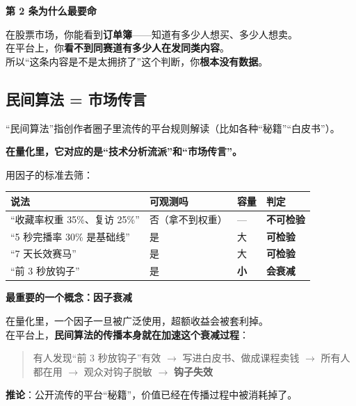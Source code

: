 \documentclass[UTF8,a4paper,11pt]{ctexart}
\newenvironment{explainbox}[1]
{\begin{center}\begin{minipage}{0.94\textwidth}\colorbox{boxbg}{\parbox{0.92\textwidth}{\textbf{#1}\par\vspace{2pt}}}}
{\end{minipage}\end{center}}
\newcommand{\hl}[1]{\textcolor{blue!70!black}{\textbf{#1}}}
\newcommand{\warn}[1]{\textcolor{red!70!black}{\textbf{#1}}}
\begin{document}
\begin{explainbox}{第 2 条为什么最要命}
在股票市场，你能看到\textbf{订单簿}——知道有多少人想买、多少人想卖。\\
在平台上，你\textbf{看不到同赛道有多少人在发同类内容}。\\
所以“这条内容是不是太拥挤了”这个判断，你\textbf{根本没有数据}。
\end{explainbox}

\subsection{民间算法 = 市场传言}

“民间算法”指创作者圈子里流传的平台规则解读（比如各种“秘籍”“白皮书”）。

\textbf{在量化里，它对应的是“技术分析流派”和“市场传言”。}

用因子的标准去筛：

\begin{center}
\begin{tabular}{p{4.6cm}p{2.2cm}p{2.0cm}p{4.4cm}}
\toprule
\textbf{说法} & \textbf{可观测吗} & \textbf{容量} & \textbf{判定} \\
\midrule
“收藏率权重 35\%、复访 25\%” & 否（拿不到权重） & — & \warn{不可检验} \\
“5 秒完播率 30\% 是基础线” & 是 & 大 & \hl{可检验} \\
“7 天长效赛马” & 是 & 大 & \hl{可检验} \\
“前 3 秒放钩子” & 是 & \warn{小} & \warn{会衰减} \\
\bottomrule
\end{tabular}
\end{center}

\begin{explainbox}{最重要的一个概念：因子衰减}
在量化里，一个因子一旦被广泛使用，超额收益会被套利掉。\\
在平台上，\textbf{民间算法的传播本身就在加速这个衰减过程}：

\begin{quote}
有人发现“前 3 秒放钩子”有效
$\to$ 写进白皮书、做成课程卖钱
$\to$ 所有人都在用
$\to$ 观众对钩子脱敏
$\to$ \textbf{钩子失效}
\end{quote}

\textbf{推论}：公开流传的平台“秘籍”，价值已经在传播过程中被消耗掉了。
\end{explainbox}

\newpage

\end{document}
